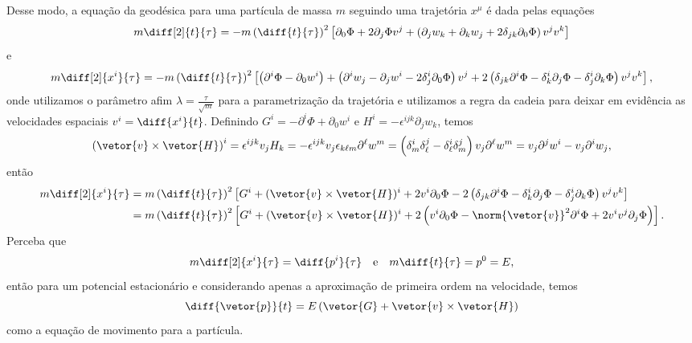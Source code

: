 Desse modo, a equação da geodésica para uma partícula de massa \(m\) seguindo uma trajetória \(x^\mu\) é dada pelas equações
\begin{equation*}
    m\diff[2]{t}{\tau} = -m \left(\diff{t}{\tau}\right)^2\left[\partial_0\Phi + 2\partial_j\Phi v^j + \left(\partial_jw_k + \partial_k w_j + 2 \delta_{jk} \partial_0 \Phi\right)v^jv^k\right]
\end{equation*}
e
\begin{equation*}
    m\diff[2]{x^i}{\tau} = -m\left(\diff{t}{\tau}\right)^2\left[\left(\partial^i\Phi - \partial_0 w^i\right) + \left(\partial^i w_j - \partial_j w^i - 2 \delta^{i}_{j} \partial_0 \Phi\right) v^j + 2\left(\delta_{jk} \partial^i\Phi - \delta^{i}_k \partial_j \Phi -\delta^i_j\partial_k \Phi\right)v^jv^k\right],
\end{equation*}
onde utilizamos o parâmetro afim \(\lambda = \frac{\tau}{\sqrt{m}}\) para a parametrização da trajetória e utilizamos a regra da cadeia para deixar em evidência as velocidades espaciais \(v^i = \diff{x^i}{t}\). Definindo \(G^i = - \partial^i \Phi + \partial_0 w^i\) e \(H^i = -\epsilon^{ijk} \partial_j w_k\), temos
\begin{equation*}
    \left(\vetor{v} \times \vetor{H}\right)^i = \epsilon^{ijk}v_j H_k = - \epsilon^{ijk} v_j \epsilon_{k\ell m}\partial^\ell w^m = \left(\delta^{i}_{m} \delta^{j}_{\ell} - \delta^{i}_{\ell} \delta^{j}_{m}\right)v_j \partial^\ell w^m = v_j \partial^j w^i - v_j \partial^i w_j,
\end{equation*}
então
\begin{align*}
    m\diff[2]{x^i}{\tau} &= m \left(\diff{t}{\tau}\right)^2 \left[G^i + (\vetor{v}\times \vetor{H})^i + 2v^i \partial_0 \Phi - 2\left(\delta_{jk} \partial^i \Phi-\delta^i_{k}\partial_j \Phi - \delta^i_{j}\partial_k \Phi\right)v^jv^k\right]\\
                         &= m \left(\diff{t}{\tau}\right)^2 \left[G^i + (\vetor{v}\times \vetor{H})^i + 2\left(v^i \partial_0 \Phi - \norm{\vetor{v}}^2 \partial^i \Phi+2v^i v^j\partial_j \Phi\right)\right].
\end{align*}
Perceba que
\begin{equation*}
    m \diff[2]{x^i}{\tau} = \diff{p^i}{\tau}\quad\text{e}\quad m \diff{t}{\tau} = p^0 = E,
\end{equation*}
então para um potencial estacionário e considerando apenas a aproximação de primeira ordem na velocidade, temos
\begin{equation*}
    \diff{\vetor{p}}{t} = E \left(\vetor{G} + \vetor{v}\times\vetor{H}\right)
\end{equation*}
como a equação de movimento para a partícula.

